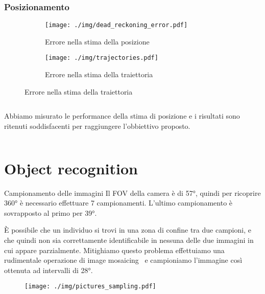 \documentclass[aspectratio=169, leqno]{beamer}
\begin{document}
	\begin{frame}
		\frametitle{Posizionamento}
		\begin{figure}[H]
			\begin{subfigure}{0.49\textwidth}
				\centering
				\texttt{[image: ./img/dead\_reckoning\_error.pdf]}
				\caption{Errore nella stima della posizione}
				\label{fig:dead_reckoning_error}
			\end{subfigure}
			\begin{subfigure}{0.49\textwidth}
				\centering
				\texttt{[image: ./img/trajectories.pdf]}
				\caption{Errore nella stima della traiettoria}
				\label{fig:trajectory_error}
			\end{subfigure}
		\end{figure}
		\begin{columns}
			\begin{column}{0.85\linewidth}
				\justifying
				Abbiamo misurato le performance della stima di posizione e i risultati
				sono ritenuti soddisfacenti per raggiungere l'obbiettivo proposto.
			\end{column}
			\begin{column}{0.15\linewidth} \end{column}
		\end{columns}
	\end{frame}
	
		
	\section{Object recognition}\label{sec:Object-recognition}
	\frame{\sectionpage}
	
	\begin{frame}{Campionamento delle immagini}
		Il FOV della camera è di 57°, quindi per ricoprire 360° è necessario
		effettuare 7 campionamenti. L'ultimo campionamento è sovrapposto al
		primo per 39°.

		È possibile che un individuo si trovi in una zona di confine
		tra due campioni, e che quindi non sia correttamente identificabile in
		nessuna delle due immagini in cui appare parzialmente. Mitighiamo
		questo problema effettuiamo una rudimentale operazione di image
		mosaicing~\cite{ghosh2016survey} e campioniamo l'immagine così
		ottenuta ad intervalli di 28°.
		
		
		\begin{figure}[H]
			\centering
			\texttt{[image: ./img/pictures\_sampling.pdf]}
			\label{fig:campionamento_immagini}
		\end{figure}
	\end{frame}
	
\end{document}
